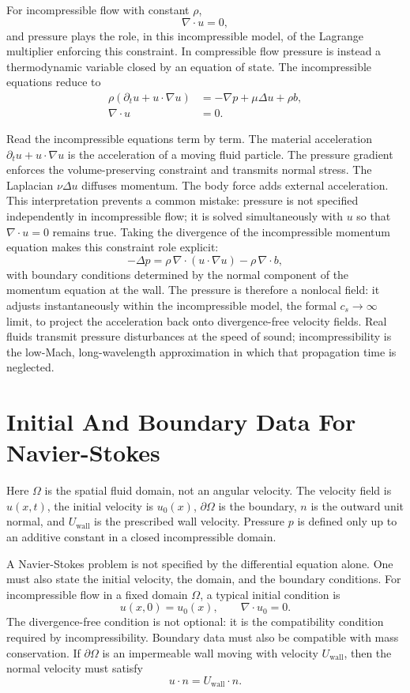 For incompressible flow with constant \(\rho\),
\[
  \nabla\cdot u=0,
\]
and pressure plays the role, in this incompressible model, of the Lagrange
multiplier enforcing this constraint. In compressible flow pressure is instead a
thermodynamic variable closed by an equation of state. The incompressible
equations reduce to
\[
  \boxed{
  \begin{aligned}
  \rho(\partial_tu+u\cdot\nabla u)&=-\nabla p+\mu\Delta u+\rho b,\\
  \nabla\cdot u&=0.
  \end{aligned}
  }
\]

Read the incompressible equations term by term. The material acceleration
\(\partial_tu+u\cdot\nabla u\) is the acceleration of a moving fluid particle.
The pressure gradient enforces the volume-preserving constraint and transmits
normal stress. The Laplacian \(\nu\Delta u\) diffuses momentum. The body force
adds external acceleration. This interpretation prevents a common mistake:
pressure is not specified independently in incompressible flow; it is solved
simultaneously with \(u\) so that \(\nabla\cdot u=0\) remains true.
Taking the divergence of the incompressible momentum equation makes this
constraint role explicit:
\[
  -\Delta p
  =
  \rho\,\nabla\cdot(u\cdot\nabla u)-\rho\,\nabla\cdot b,
\]
with boundary conditions determined by the normal component of the momentum
equation at the wall. The pressure is therefore a nonlocal field: it adjusts
instantaneously within the incompressible model, the formal \(c_s\to\infty\)
limit, to project the acceleration back onto divergence-free velocity fields.
Real fluids transmit pressure disturbances at the speed of sound;
incompressibility is the low-Mach, long-wavelength approximation in which that
propagation time is neglected.

\section{Initial And Boundary Data For Navier-Stokes}
\label{sec:navier-stokes-data}

Here \(\Omega\) is the spatial fluid domain, not an angular velocity.  The
velocity field is \(u(x,t)\), the initial velocity is \(u_0(x)\),
\(\partial\Omega\) is the boundary, \(n\) is the outward unit normal, and
\(U_{\mathrm{wall}}\) is the prescribed wall velocity.  Pressure \(p\) is
defined only up to an additive constant in a closed incompressible domain.

A Navier-Stokes problem is not specified by the differential equation alone.
One must also state the initial velocity, the domain, and the boundary
conditions. For incompressible flow in a fixed domain \(\Omega\), a typical
initial condition is
\[
  u(x,0)=u_0(x),
  \qquad
  \nabla\cdot u_0=0.
\]
The divergence-free condition is not optional: it is the compatibility
condition required by incompressibility. Boundary data must also be compatible
with mass conservation. If \(\partial\Omega\) is an impermeable wall moving
with velocity \(U_{\mathrm{wall}}\), then the normal velocity must satisfy
\[
  u\cdot n=U_{\mathrm{wall}}\cdot n.
\]

